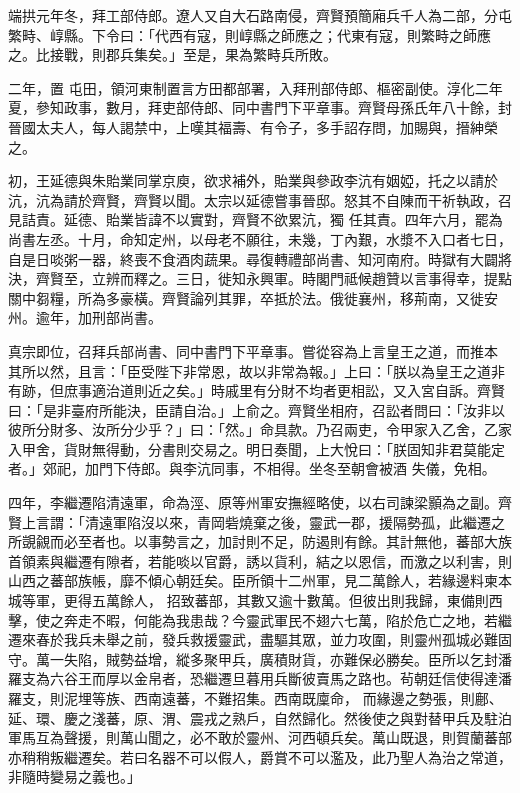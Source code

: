 \begin{pinyinscope}
 端拱元年冬，拜工部侍郎。遼人又自大石路南侵，齊賢預簡廂兵千人為二部，分屯繁畤、崞縣。下令曰：「代西有寇，則崞縣之師應之；代東有寇，則繁畤之師應之。比接戰，則郡兵集矣。」至是，果為繁畤兵所敗。



 二年，置
 屯田，領河東制置言方田都部署，入拜刑部侍郎、樞密副使。淳化二年夏，參知政事，數月，拜吏部侍郎、同中書門下平章事。齊賢母孫氏年八十餘，封晉國太夫人，每人謁禁中，上嘆其福壽、有令子，多手詔存問，加賜與，搢紳榮之。



 初，王延德與朱貽業同掌京庾，欲求補外，貽業與參政李沆有姻婭，托之以請於沆，沆為請於齊賢，齊賢以聞。太宗以延德嘗事晉邸。怒其不自陳而干祈執政，召見詰責。延德、貽業皆諱不以實對，齊賢不欲累沆，獨
 任其責。四年六月，罷為尚書左丞。十月，命知定州，以母老不願往，未幾，丁內艱，水漿不入口者七日，自是日啖粥一器，終喪不食酒肉蔬果。尋復轉禮部尚書、知河南府。時獄有大闢將決，齊賢至，立辨而釋之。三日，徙知永興軍。時閣門祗候趙贊以言事得幸，提點關中芻糧，所為多豪橫。齊賢論列其罪，卒抵於法。俄徙襄州，移荊南，又徙安州。逾年，加刑部尚書。



 真宗即位，召拜兵部尚書、同中書門下平章事。嘗從容為上言皇王之道，而推本
 其所以然，且言：「臣受陛下非常恩，故以非常為報。」上曰：「朕以為皇王之道非有跡，但庶事適治道則近之矣。」時戚里有分財不均者更相訟，又入宮自訴。齊賢曰：「是非臺府所能決，臣請自治。」上俞之。齊賢坐相府，召訟者問曰：「汝非以彼所分財多、汝所分少乎？」曰：「然。」命具款。乃召兩吏，令甲家入乙舍，乙家入甲舍，貨財無得動，分書則交易之。明日奏聞，上大悅曰：「朕固知非君莫能定者。」郊祀，加門下侍郎。與李沆同事，不相得。坐冬至朝會被酒
 失儀，免相。



 四年，李繼遷陷清遠軍，命為涇、原等州軍安撫經略使，以右司諫梁顥為之副。齊賢上言謂：「清遠軍陷沒以來，青岡砦燒棄之後，靈武一郡，援隔勢孤，此繼遷之所覬覦而必至者也。以事勢言之，加討則不足，防遏則有餘。其計無他，蕃部大族首領素與繼遷有隙者，若能啖以官爵，誘以貨利，結之以恩信，而激之以利害，則山西之蕃部族帳，靡不傾心朝廷矣。臣所領十二州軍，見二萬餘人，若緣邊料柬本城等軍，更得五萬餘人，
 招致蕃部，其數又逾十數萬。但彼出則我歸，東備則西擊，使之奔走不暇，何能為我患哉？今靈武軍民不翅六七萬，陷於危亡之地，若繼遷來春於我兵未舉之前，發兵救援靈武，盡驅其眾，並力攻圍，則靈州孤城必難固守。萬一失陷，賊勢益增，縱多聚甲兵，廣積財貨，亦難保必勝矣。臣所以乞封潘羅支為六谷王而厚以金帛者，恐繼遷旦暮用兵斷彼賣馬之路也。茍朝廷信使得達潘羅支，則泥埋等族、西南遠蕃，不難招集。西南既廩命，
 而緣邊之勢張，則鄜、延、環、慶之淺蕃，原、渭、震戎之熟戶，自然歸化。然後使之與對替甲兵及駐泊軍馬互為聲援，則萬山聞之，必不敢於靈州、河西頓兵矣。萬山既退，則賀蘭蕃部亦稍稍叛繼遷矣。若曰名器不可以假人，爵賞不可以濫及，此乃聖人為治之常道，非隨時變易之義也。」




\end{pinyinscope}
